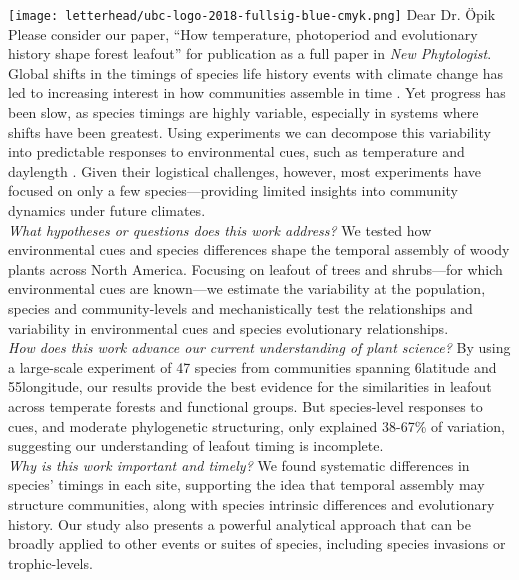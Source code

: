\documentclass[11pt,a4paper]{article}
\begin{document}

\noindent \texttt{[image: letterhead/ubc-logo-2018-fullsig-blue-cmyk.png]}
\noindent Dear Dr. Öpik
\vspace{1.5ex}\\
\noindent Please consider our paper, ``How temperature, photoperiod and evolutionary history shape forest leafout'' for publication as a full paper in \emph{New Phytologist}. 
\vspace{1.5ex}\\ 
Global shifts in the timings of species life history events with climate change has led to increasing interest in how communities assemble in time \citep{Cope2022, Cleland2024}. Yet progress has been slow, as species timings are highly variable, especially in systems where shifts have been greatest. Using experiments we can decompose this variability into predictable responses to environmental cues, such as temperature and daylength \citep{Basler2014,Vitasse2014,Zohner2016}. Given their logistical challenges, however, most experiments have focused on only a few species---providing limited insights into community dynamics under future climates.
\vspace{1.5ex}\\ 
\noindent \textit{What hypotheses or questions does this work address?} We tested how environmental cues and species differences shape the temporal assembly of woody plants across North America. Focusing on leafout of trees and shrubs---for which environmental cues are known---we estimate the variability at the population, species and community-levels and mechanistically test the relationships and variability in environmental cues and species evolutionary relationships. %
\vspace{1.5ex}\\ 
\noindent \textit{How does this work advance our current understanding of plant science?}  By using a large-scale experiment of 47 species from communities spanning 6\textdegree latitude and 55\textdegree longitude, our results provide the best evidence for the similarities in leafout across temperate forests and functional groups. But species-level responses to cues, and moderate phylogenetic structuring, only explained 38-67\% of variation, suggesting our understanding of leafout timing is incomplete. %
\vspace{1.5ex}\\
\noindent \textit{Why is this work important and timely?} We found systematic differences in species' timings in each site, supporting the idea that temporal assembly may structure communities, along with species intrinsic differences and evolutionary history. Our study also presents a powerful analytical approach that can be broadly applied to other events or suites of species, including species invasions or trophic-levels. %
\end{document}
